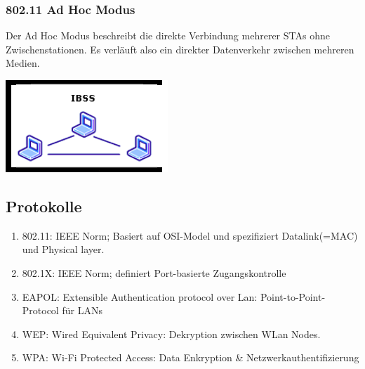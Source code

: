 \documentclass[11pt]{article}
\begin{document}
    \subsubsection{802.11 Ad Hoc Modus}
    \begin{minipage}{0.7\textwidth}     %
        Der Ad Hoc Modus beschreibt die direkte Verbindung mehrerer STAs ohne Zwischenstationen.
        Es verläuft also ein direkter Datenverkehr zwischen mehreren Medien.
    \end{minipage}
    \begin{minipage}{0.3\textwidth}     %
        \includegraphics[width=\linewidth]{802-11_AdHoc.png}
    \end{minipage}

    \subsection{Protokolle}
    \begin{enumerate}[$\diamond$]
        \item 802.11: IEEE Norm; Basiert auf OSI-Model und spezifiziert Datalink(=MAC) und Physical layer.
        \item 802.1X: IEEE Norm; definiert Port-basierte Zugangskontrolle
        \item EAPOL: Extensible Authentication protocol over Lan: Point-to-Point-Protocol für LANs
        \item WEP: Wired Equivalent Privacy: Dekryption zwischen WLan Nodes.
        \item WPA: Wi-Fi Protected Access: Data Enkryption \& Netzwerkauthentifizierung\\
    \end{enumerate}
\end{document}
